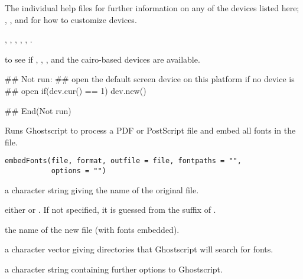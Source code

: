%
\begin{SeeAlso}\relax
The individual help files for further information on any of the
devices listed here;
, ,
 and  for how to
customize devices.

,
, ,
, ,
.

 to see if ,
 , ,
 and the cairo-based devices are available.
\end{SeeAlso}
%
\begin{Examples}
\begin{ExampleCode}
## Not run: 
## open the default screen device on this platform if no device is
## open
if(dev.cur() == 1) dev.new()

## End(Not run)
\end{ExampleCode}
\end{Examples}
%
\begin{Description}\relax
Runs Ghostscript to process a PDF or PostScript file and
embed all fonts in the file.
\end{Description}
%
\begin{Usage}
\begin{verbatim}
embedFonts(file, format, outfile = file, fontpaths = "",
           options = "")
\end{verbatim}
\end{Usage}
%
\begin{Arguments}
\begin{ldescription}
\item[\code{file}] a character string giving the name of the original file.
\item[\code{format}] either  or .
If not specified, it is guessed from the suffix of .
\item[\code{outfile}] the name of the new file (with fonts embedded).
\item[\code{fontpaths}] a character vector giving directories that
Ghostscript will search for fonts.
\item[\code{options}] a character string containing further options to
Ghostscript.
\end{ldescription}
\end{Arguments}
